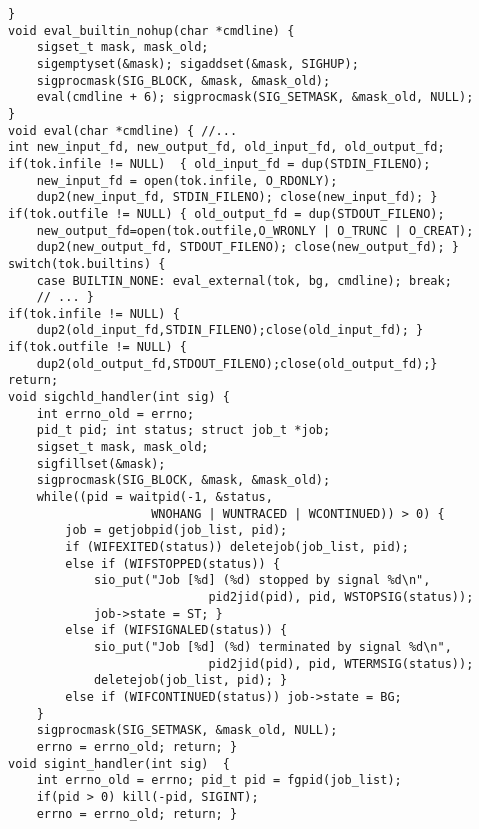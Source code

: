 \begin{verbatim}
}
void eval_builtin_nohup(char *cmdline) {
    sigset_t mask, mask_old;
    sigemptyset(&mask); sigaddset(&mask, SIGHUP);
    sigprocmask(SIG_BLOCK, &mask, &mask_old);
    eval(cmdline + 6); sigprocmask(SIG_SETMASK, &mask_old, NULL);
}
void eval(char *cmdline) { //...
int new_input_fd, new_output_fd, old_input_fd, old_output_fd;
if(tok.infile != NULL)  { old_input_fd = dup(STDIN_FILENO);
    new_input_fd = open(tok.infile, O_RDONLY);
    dup2(new_input_fd, STDIN_FILENO); close(new_input_fd); }
if(tok.outfile != NULL) { old_output_fd = dup(STDOUT_FILENO);
    new_output_fd=open(tok.outfile,O_WRONLY | O_TRUNC | O_CREAT);
    dup2(new_output_fd, STDOUT_FILENO); close(new_output_fd); }
switch(tok.builtins) {
    case BUILTIN_NONE: eval_external(tok, bg, cmdline); break;
    // ... }
if(tok.infile != NULL) { 
    dup2(old_input_fd,STDIN_FILENO);close(old_input_fd); }
if(tok.outfile != NULL) {
    dup2(old_output_fd,STDOUT_FILENO);close(old_output_fd);}
return;
void sigchld_handler(int sig) {   
    int errno_old = errno;
    pid_t pid; int status; struct job_t *job;
    sigset_t mask, mask_old;
    sigfillset(&mask);
    sigprocmask(SIG_BLOCK, &mask, &mask_old);
    while((pid = waitpid(-1, &status, 
                    WNOHANG | WUNTRACED | WCONTINUED)) > 0) {
        job = getjobpid(job_list, pid);
        if (WIFEXITED(status)) deletejob(job_list, pid);
        else if (WIFSTOPPED(status)) {
            sio_put("Job [%d] (%d) stopped by signal %d\n", 
                            pid2jid(pid), pid, WSTOPSIG(status));
            job->state = ST; }
        else if (WIFSIGNALED(status)) {
            sio_put("Job [%d] (%d) terminated by signal %d\n", 
                            pid2jid(pid), pid, WTERMSIG(status));
            deletejob(job_list, pid); }
        else if (WIFCONTINUED(status)) job->state = BG;
    }
    sigprocmask(SIG_SETMASK, &mask_old, NULL);
    errno = errno_old; return; }
void sigint_handler(int sig)  {
    int errno_old = errno; pid_t pid = fgpid(job_list);
    if(pid > 0) kill(-pid, SIGINT);
    errno = errno_old; return; }
\end{verbatim}
\vspace{-10pt}